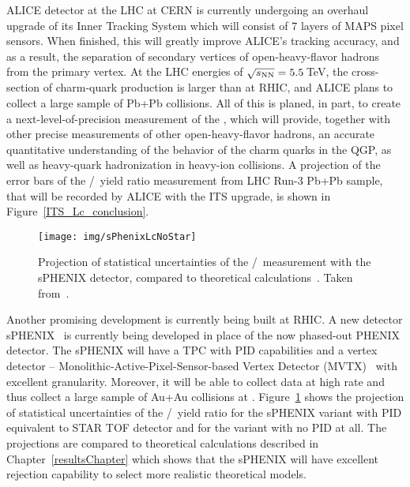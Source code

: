 ALICE detector at the LHC at CERN is currently undergoing an overhaul upgrade of its Inner Tracking System which will consist of 7 layers of MAPS pixel sensors. When finished, this will greatly improve ALICE's tracking accuracy, and as a result, the separation of secondary vertices of open-heavy-flavor hadrons from the primary vertex. At the LHC energies of $\sqrt{s_\text{NN}} = 5.5\,$TeV, the cross-section of charm-quark production is larger than at RHIC, and ALICE plans to collect a large sample of Pb+Pb collisions. All of this is planed, in part, to create a next-level-of-precision measurement of the \Lambdac, which will provide, together with other precise measurements of other open-heavy-flavor hadrons, an accurate quantitative understanding of the behavior of the charm quarks in the QGP, as well as heavy-quark hadronization in heavy-ion collisions. A projection of the error bars of the \Lambdac/\dzero\ yield ratio measurement from LHC Run-3 Pb+Pb sample, that will be recorded by ALICE with the ITS upgrade, is shown in Figure~\ref{ITS_Lc_conclusion}\@.

\begin{figure}[!htb]
\centering
\texttt{[image: img/sPhenixLcNoStar]}
\caption[Projection of statistical uncertainties of the \Lambdac/\dzero\ measurement with the sPHENIX detector\@.]{\label{sPhenixLcProjection}Projection of statistical uncertainties of the \Lambdac/\dzero\ measurement with the sPHENIX detector, compared to theoretical calculations~\cite{CataniaLc, Tsinghua, RappLc, Monash, DIPSY}\@. Taken from~\cite{sPhenixLc}.}

\end{figure}

Another promising development is currently being built at RHIC\@. A new detector s\-PHEN\-IX~\cite{sphenix} is currently being developed in place of the now phased-out PHENIX detector. The sPHENIX will have a TPC with PID capabilities and a vertex detector -- Monolithic-Active-Pixel-Sensor-based Vertex Detector (MVTX)~\cite{sPhenixMvtx} with excellent granularity. Moreover, it will be able to collect data at high rate and thus collect a large sample of Au+Au collisions at \snnFull\@. Figure~\ref{sPhenixLcProjection} shows the projection of statistical uncertainties of the \Lambdac/\dzero\ yield ratio for the sPHENIX variant with PID equivalent to STAR TOF detector and for the variant with no PID at all. The projections are compared to theoretical calculations described in Chapter~\ref{resultsChapter} which shows that the sPHENIX will have excellent rejection capability to select more realistic theoretical models. 

